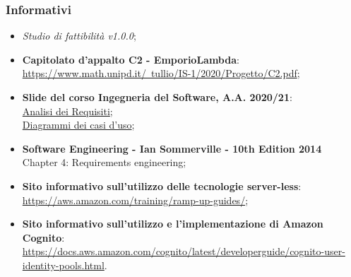 \subsubsection{Informativi}
\begin{itemize}
    \item \textit{Studio di fattibilità v1.0.0};
    \item \textbf{Capitolato d'appalto C2 - EmporioLambda}:\\ \href{https://www.math.unipd.it/~tullio/IS-1/2020/Progetto/C2.pdf}{https://www.math.unipd.it/~tullio/IS-1/2020/Progetto/C2.pdf};
    \item \textbf{Slide del corso Ingegneria del Software, A.A. 2020/21}: \\ \href{https://www.math.unipd.it/~tullio/IS-1/2020/Dispense/L07.pdf}{Analisi dei Requisiti}; \\ \href{https://www.math.unipd.it/~rcardin/swea/2021/Diagrammi%20Use%20Case_4x4.pdf}{Diagrammi dei casi d'uso};
    \item \textbf{Software Engineering - Ian Sommerville - 10th Edition 2014}\\
          Chapter 4: Requirements engineering;
    \item \textbf{Sito informativo sull'utilizzo delle tecnologie server-less}:\\ \href{https://aws.amazon.com/training/ramp-up-guides/}{https://aws.amazon.com/training/ramp-up-guides/};
    \item \textbf{Sito informativo sull'utilizzo e l'implementazione di Amazon Cognito}:\\ \href{https://docs.aws.amazon.com/cognito/latest/developerguide/cognito-user-identity-pools.html}{https://docs.aws.amazon.com/cognito/latest/developerguide/cognito-user-identity-pools.html}.
\end{itemize}